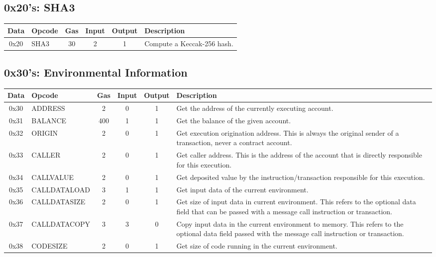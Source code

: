 \documentclass[10pt,a4paper,leqno,bibliography=totoc]{scrartcl}
\newenvironment{alphafootnotes}
{\par\edef\savedfootnotenumber{\number\value{footnote}}
\renewcommand{\thefootnote}{\alph{footnote}}
\setcounter{footnote}{0}}
{\par\setcounter{footnote}{\savedfootnotenumber}}
\begin{document}
\begin{alphafootnotes}
	        \subsection{0x20's: SHA3}
			\begin{longtable}{|cP{2.8cm}cccp{6cm}|}
			\hline
		        \textbf{Data} & \textbf{Opcode} & \textbf{Gas}  & \textbf{Input}  & \textbf{Output} & \textbf{Description} \\
			\hline
			0x20 & SHA3 & 30 & 2 & 1 & Compute a Keccak-256 hash. \\
			\hline
			\end{longtable}

        	\subsection{0x30's: Environmental Information}
			\begin{longtable}{|cP{2.8cm}cccp{6cm}|}
			\hline
	        	\textbf{Data} & \textbf{Opcode} & \textbf{Gas}  & \textbf{Input}  & \textbf{Output} & \textbf{Description} \\
			\hline
			0x30 & ADDRESS & 2 & 0 & 1 & Get the address of the currently executing account. \\
			0x31 & BALANCE & 400 & 1 & 1 & Get the balance of the given account. \\
			0x32 & ORIGIN & 2 & 0 & 1 & Get execution origination address. This is always the original sender of a transaction, never a contract account. \\
			0x33 & CALLER & 2 & 0 & 1 & Get caller address. This is the address of the account that is directly responsible for this execution. \\
			0x34 & CALLVALUE & 2 & 0 & 1 & Get deposited value by the instruction/transaction responsible for this execution. \\
			0x35 & CALLDATALOAD & 3 & 1 & 1 & Get input data of the current environment. \\
			0x36 & CALLDATASIZE & 2 & 0 & 1 & Get size of input data in current environment. This refers to the optional data field that can be passed with a message call instruction or transaction.\\
			0x37 & CALLDATACOPY & 3 & 3 & 0 & Copy input data in the current environment to memory. This refers to the optional data field passed with the message call instruction or transaction. \\
			0x38 & CODESIZE & 2 & 0 & 1 & Get size of code running in the current environment. \\

\end{longtable}
\end{alphafootnotes}
\end{document}
